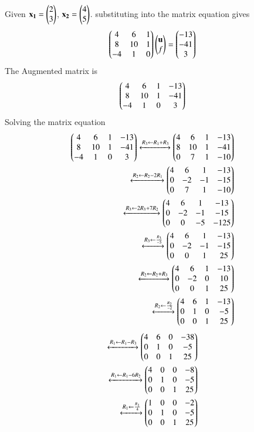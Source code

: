 \documentclass[journal]{IEEEtran}
\begin{document}
Given $\mathbf{x_1}=\begin{pmatrix}2\\3\end{pmatrix}$, $\mathbf{x_2}=\begin{pmatrix}4\\5\end{pmatrix}$. substituting into the matrix equation gives
\begin{align}
\begin{pmatrix}4 & 6 & 1\\8 & 10 & 1\\-4 & 1 & 0\end{pmatrix}\begin{pmatrix}\mathbf{u}\\f\end{pmatrix}=\begin{pmatrix}-13\\-41\\3\end{pmatrix}
\end{align}
The Augmented matrix is 
\begin{align}
\begin{pmatrix}4 & 6 & 1 & -13\\8 & 10 & 1 & -41\\-4 & 1 & 0 & 3\end{pmatrix}
\end{align}
Solving the matrix equation
\begin{align}
\begin{pmatrix}4 & 6 & 1 & -13\\8 & 10 & 1 & -41\\-4 & 1 & 0 & 3\end{pmatrix}\xleftrightarrow[]{R_3 \leftarrow R_1+R_3}\begin{pmatrix}4 & 6 & 1 & -13\\8 & 10 & 1 & -41\\0 & 7 & 1 & -10\end{pmatrix}\\
\xleftrightarrow[]{R_2 \leftarrow R_2-2R_1}\begin{pmatrix}4 & 6 & 1 & -13\\0 & -2 & -1 & -15\\0 & 7 & 1 & -10\end{pmatrix}\\
\xleftrightarrow[]{R_3 \leftarrow 2R_3+7R_2}\begin{pmatrix}4 & 6 & 1 & -13\\0 & -2 & -1 & -15\\0 & 0 & -5 & -125\end{pmatrix}\\
\xleftrightarrow[]{R_3 \leftarrow \frac{R_3}{-5}}\begin{pmatrix}4 & 6 & 1 & -13\\0 & -2 & -1 & -15\\0 & 0 & 1 & 25\end{pmatrix}\\
\xleftrightarrow[]{R_2 \leftarrow R_2+R_3}\begin{pmatrix}4 & 6 & 1 & -13\\0 & -2 & 0 & 10\\0 & 0 & 1 & 25\end{pmatrix}\\
\xleftrightarrow[]{R_2 \leftarrow \frac{R_2}{-2}}\begin{pmatrix}4 & 6 & 1 & -13\\0 & 1 & 0 & -5	\\0 & 0 & 1 & 25\end{pmatrix}
\end{align}
\begin{align}
\xleftrightarrow[]{R_1 \leftarrow R_1-R_3}\begin{pmatrix}4 & 6 & 0 & -38\\0 & 1 & 0 & -5\\0 & 0 & 1 & 25\end{pmatrix}\\
\xleftrightarrow[]{R_1 \leftarrow R_1-6R_2}\begin{pmatrix}4 & 0 & 0 & -8\\0 & 1 & 0 & -5\\0 & 0 & 1 & 25\end{pmatrix}\\
\xleftrightarrow[]{R_1 \leftarrow \frac{R_1}{4}}\begin{pmatrix}1 & 0 & 0 & -2\\0 & 1 & 0 & -5\\0 & 0 & 1 & 25\end{pmatrix}
\end{align}
\end{document}
